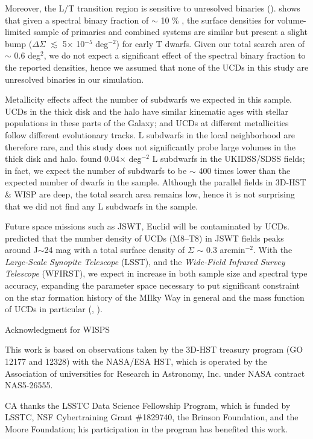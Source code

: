 \documentclass[manuscript]{aastex}
\begin{document}
Moreover, the L/T transition region is sensitive to unresolved binaries (\citealt{2014ApJ...794..143B}). \cite{2007ApJ...659..655B} shows that given a spectral binary fraction of $\sim$ 10 \% , the surface densities for volume-limited sample of primaries and combined systems are similar but present a slight bump ($\Delta \Sigma$ $\lesssim$ 5$\times$ 10$^{-5}$ deg$^{-2}$) for early T dwarfs. Given our total search area of $\sim$ 0.6 deg$^2$, we do not expect a significant effect of the spectral binary fraction to the reported densities, hence we assumed that none of the UCDs  in this study are unresolved binaries in our simulation.

Metallicity effects affect the number of subdwarfs we expected in this sample. UCDs in the thick disk and the halo have similar kinematic ages with stellar populations in these parts of the Galaxy; and UCDs at different metallicities follow different evolutionary tracks. L subdwarfs in the local neighborhood are therefore rare, and this study does not significantly probe large volumes in the thick disk and halo. \cite{Lodieu2017} found 0.04$\times$ deg$^{-2}$ L subdwarfs in the UKIDSS/SDSS fields; in fact, we expect the number of subdwarfs to be $\sim$ 400 times lower than the expected number of dwarfs in the sample. Although the parallel fields in 3D-HST \& WISP are deep, the total search area remains low, hence it is not surprising that we did not find any L subdwarfs in the sample. 

Future space missions such as JSWT, Euclid will be contaminated by UCDs. \cite{RyanJr.2016} predicted that the number density of UCDs (M8--T8) in JSWT fields peaks around J$\sim$24 mag with a total surface density of $\Sigma$ $\sim$ 0.3 arcmin$^{-2}$.  With the \textit{Large-Scale Synopitc Telescope} (LSST), and the \textit{Wide-Field Infrared Survey Telescope} (WFIRST), we expect in increase in both sample size and spectral type accuracy, expanding the parameter space necessary to put significant constraint on the star formation history of the MIlky Way in general and the mass function of UCDs in particular (\citealt{LSSTScienceCollaboration2009}, \citealt{Spergel2015}).

\acknowledgements
{\color{green} Acknowledgment for WISPS}

This work is based on observations taken by the 3D-HST treasury program (GO 12177 and 12328) with the NASA/ESA HST, which is operated by the Association of universities for Research in Astronomy, Inc. under NASA contract NAS5-26555.

CA thanks the LSSTC Data Science Fellowship Program, which is funded by LSSTC, NSF Cybertraining Grant \#1829740, the Brinson Foundation, and the Moore Foundation; his participation in the program has benefited this work.

\clearpage





 
\end{document}
